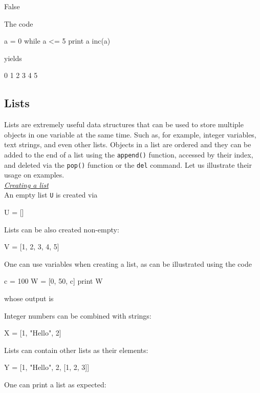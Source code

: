 \begin{bluecode}
False
\end{bluecode}
The code 

\begin{bluecode}
a = 0
while a <= 5
  print a 
  inc(a)
\end{bluecode}
yields 

\begin{bluecode}
0
1
2
3
4
5
\end{bluecode}

\subsection{Lists}

Lists are extremely useful data structures that can be used to store multiple 
objects in one variable at the same time. 
Such as, for example, integer variables, text strings, and even other lists.
Objects in a list are ordered and they can be added to the end of a list 
using the {\tt append()} function, accessed by their index, and 
deleted via the {\tt pop()} function or the {\tt del} command. Let us 
illustrate their usage on examples.\\

\noindent
\underline{\em Creating a list}\\

An empty list {\tt U} is created via 

\begin{bluecode}
U = []
\end{bluecode}
Lists can be also created non-empty:

\begin{bluecode}
V = [1, 2, 3, 4, 5]
\end{bluecode}
One can use variables when creating a list, as can be 
illustrated using the code

\begin{bluecode}
c = 100
W = [0, 50, c]
print W
\end{bluecode}
whose output is 

\begin{bluecode}
[0, 50, 100]
\end{bluecode}
Integer numbers can be combined with strings:

\begin{bluecode}
X = [1, "Hello", 2]
\end{bluecode}
Lists can contain other lists as their elements:

\begin{bluecode}
Y = [1, "Hello", 2, [1, 2, 3]]
\end{bluecode}
One can print a list as expected:

